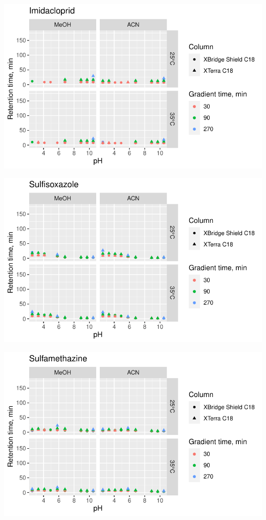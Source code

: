 \documentclass[
  letterpaper,
  DIV=11,
  numbers=noendperiod]{scrreprt}
\begin{document}
\includegraphics{index_files/figure-pdf/unnamed-chunk-4-144.pdf}

\includegraphics{index_files/figure-pdf/unnamed-chunk-4-145.pdf}

\includegraphics{index_files/figure-pdf/unnamed-chunk-4-146.pdf}
\end{document}
